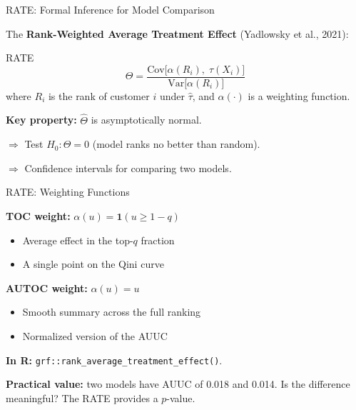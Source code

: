 \documentclass[aspectratio=169, 11pt]{beamer}
\newcommand{\Var}{\mathrm{Var}}
\newcommand{\Cov}{\mathrm{Cov}}
\begin{document}
\begin{frame}{RATE: Formal Inference for Model Comparison}
 
The \textbf{Rank-Weighted Average Treatment Effect} (Yadlowsky et al., 2021):
 
\begin{block}{RATE}
\[
\Theta = \frac{\Cov\bigl[\alpha(R_i),\; \tau(X_i)\bigr]}{\Var\bigl[\alpha(R_i)\bigr]}
\]
where $R_i$ is the rank of customer $i$ under $\hat{\tau}$, and $\alpha(\cdot)$ is a weighting function.
\end{block}
 
\bigskip
 
\textbf{Key property:} $\hat{\Theta}$ is asymptotically normal.
 
\bigskip
 
$\Rightarrow$ Test $H_0: \Theta = 0$ (model ranks no better than random).
 
$\Rightarrow$ Confidence intervals for comparing two models.
\end{frame}
 
\begin{frame}{RATE: Weighting Functions}
 
\textbf{TOC weight:} $\alpha(u) = \mathbf{1}(u \geq 1 - q)$
 
\begin{itemize}
    \item Average effect in the top-$q$ fraction
    \item A single point on the Qini curve
\end{itemize}
 
\bigskip
 
\textbf{AUTOC weight:} $\alpha(u) = u$
 
\begin{itemize}
    \item Smooth summary across the full ranking
    \item Normalized version of the AUUC
\end{itemize}
 
\bigskip
 
\textbf{In R:} \texttt{grf::rank\_average\_treatment\_effect()}.
 
\bigskip
 
\textbf{Practical value:} two models have AUUC of 0.018 and 0.014. Is the difference meaningful? The RATE provides a $p$-value.
\end{frame}
 
\end{document}
